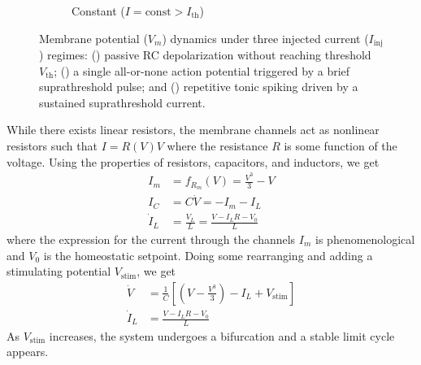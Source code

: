\documentclass{article}
\theoremstyle{definition}
\begin{document}
\begin{figure}[htbp]
\begin{subfigure}[b]{0.32\textwidth}
{%
        }
        \caption{Constant ($I = \text{const} > I_{\text{th}}$)}
        \label{fig:ap-constant}
    \end{subfigure}

    \caption{Membrane potential ($V_m$) dynamics under three injected current ($I_{\text{inj}}$) regimes: () passive RC depolarization without reaching threshold $V_{\text{th}}$; () a single all-or-none action potential triggered by a brief suprathreshold pulse; and () repetitive tonic spiking driven by a sustained suprathreshold current.}
    \label{fig:ap-regimes-grid}
\end{figure}
While there exists linear resistors, the membrane channels act as nonlinear resistors such that $I=R(V)V$ where the resistance $R$ is some function of the voltage. 
Using the properties of resistors, capacitors, and inductors, we get 
\begin{equation*}
    \begin{split}
        I_m &= f_{R_m}(V) = \frac{V^3}{3}-V\\
        I_{C} &=C\dot V = -I_m-I_L\\
        \dot I_L &= \frac{V_L}{L} = \frac{V-I_LR-V_0}{L} 
    \end{split}
\end{equation*}
where the expression for the current through the channels $I_m$ is phenomenological and $V_0$ is the homeostatic setpoint. Doing some rearranging and adding a stimulating potential $V_{\text{stim}}$, we get 
\begin{equation*}
    \begin{split}
        \dot V&= \frac{1}{C} \left[ \left(V-\frac{V^3}{3} \right) -I_L + V_{\text{stim}}\right] \\
        \dot I_L&= \frac{V-I_LR-V_0}{L}
    \end{split}
\end{equation*}
As $V_\text{stim}$ increases, the system undergoes a bifurcation and a stable limit cycle appears.
\end{document}
